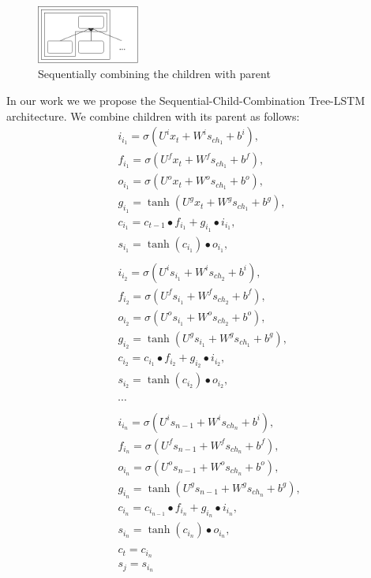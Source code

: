 \documentclass[10pt, a4paper]{article}
\begin{document}
\begin{figure}[h]
	 \begin{center}
    	\includegraphics[width=0.3\textwidth]{imgs/sequentialchild}
		\caption{Sequentially combining the children with parent}
		\label{tab:sequentialchild}
	 \end{center}
\end{figure}
	In our work we we propose the Sequential-Child-Combination Tree-LSTM architecture. We combine children with its parent as follows:
\begin{equation}
\begin{split}
&i_{i_1} = \sigma(U^i{x_t} + W^i{s_{ch_1}} + b^i) ,\\
&f_{i_1} = \sigma(U^f{x_t} + W^f{s_{ch_1}} + b^f) ,\\
&o_{i_1} = \sigma(U^o{x_t} + W^o{s_{ch_1}} + b^o) ,\\
&g_{i_1} = \tanh(U^g{x_t}+ W^g{s_{ch_1}} + b^g) ,\\
&c_{i_1} = c_{t-1} \bullet f_{i_1} + g_{i_1} \bullet i_{i_1} ,\\
&s_{i_1} = \tanh({c_{i_1}}) \bullet o_{i_1},\\\\
&i_{i_2} = \sigma(U^is_{i_1} + W^is_{ch_2} + b^i) ,\\
&f_{i_2} = \sigma(U^fs_{i_1} + W^fs_{ch_2} + b^f) ,\\
&o_{i_2} = \sigma(U^os_{i_1} + W^os_{ch_2} + b^o) ,\\
&g_{i_2} = \tanh(U^gs_{i_1}+ W^gs_{ch_1} + b^g) ,\\
&c_{i_2} = c_{i_1} \bullet f_{i_2} + g_{i_2} \bullet i_{i_2} ,\\
&s_{i_2} = \tanh(c_{i_2}) \bullet o_{i_2},\\\\
&\cdots\\\\
&i_{i_n} = \sigma(U^is_{{n-1}} + W^is_{ch_{n}} + b^i) ,\\
&f_{i_n} = \sigma(U^fs_{{n-1}} + W^fs_{ch_{n}} + b^f) ,\\
&o_{i_n} = \sigma(U^os_{{n-1}} + W^os_{ch_{n}} + b^o) ,\\
&g_{i_n} = \tanh(U^gs_{{n-1}}+ W^gs_{ch_{n}} + b^g) ,\\
&c_{i_n} = c_{i_{n-1}} \bullet f_{i_n} + g_{i_n} \bullet i_{i_n} ,\\
&s_{i_n} = \tanh(c_{i_n}) \bullet o_{i_n},\\\\
&c_{t} = c_{i_n}\\
&s_{j} = s_{i_n}
\end{split}
\end{equation}
\end{document}
